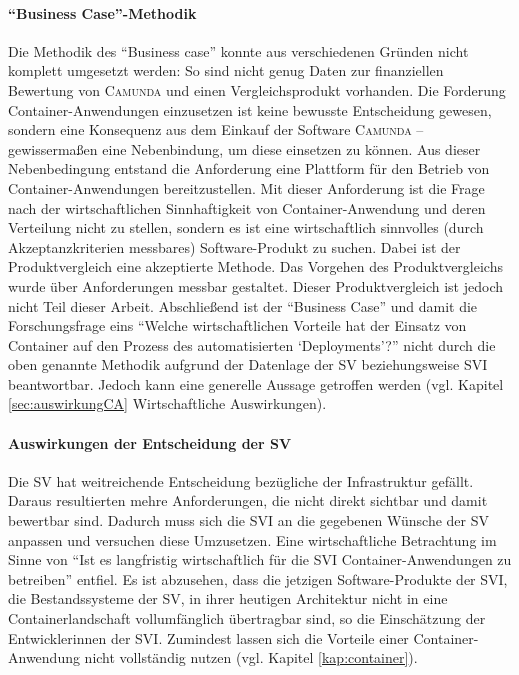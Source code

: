 \paragraph{\enquote{Business Case}-Methodik} Die Methodik des \enquote{Business case} konnte aus verschiedenen Gründen nicht komplett umgesetzt werden: So sind nicht genug Daten zur finanziellen Bewertung von \textsc{Camunda} und einen Vergleichsprodukt vorhanden. Die Forderung Container-Anwendungen einzusetzen ist keine bewusste Entscheidung gewesen, sondern eine Konsequenz aus dem Einkauf der Software \textsc{Camunda} -- gewissermaßen eine Nebenbindung, um diese einsetzen zu können. Aus dieser Nebenbedingung entstand die Anforderung eine Plattform für den Betrieb von Container-Anwendungen bereitzustellen. Mit dieser Anforderung ist die Frage nach der wirtschaftlichen Sinnhaftigkeit von Container-Anwendung und deren Verteilung nicht zu stellen, sondern es ist eine wirtschaftlich sinnvolles (durch Akzeptanzkriterien messbares) Software-Produkt zu suchen. Dabei ist der Produktvergleich eine akzeptierte Methode. Das Vorgehen des Produktvergleichs wurde über Anforderungen messbar gestaltet. Dieser Produktvergleich ist jedoch nicht Teil dieser Arbeit. Abschließend ist der \enquote{Business Case} und damit die Forschungsfrage eins \enquote{Welche wirtschaftlichen Vorteile hat der Einsatz von Container auf den Prozess des automatisierten \enquote{Deployments}?} nicht durch die oben genannte Methodik aufgrund der Datenlage der \ac{SV} beziehungsweise \ac{SVI} beantwortbar. Jedoch kann eine generelle Aussage getroffen werden (vgl. Kapitel \vref{sec:auswirkungCA} Wirtschaftliche Auswirkungen).

\paragraph{Auswirkungen der Entscheidung der \ac{SV}} Die \ac{SV} hat weitreichende Entscheidung bezügliche der Infrastruktur gefällt. Daraus resultierten mehre Anforderungen, die nicht direkt sichtbar und damit bewertbar sind. Dadurch muss sich die \ac{SVI} an die gegebenen Wünsche der \ac{SV} anpassen und versuchen diese Umzusetzen. Eine wirtschaftliche Betrachtung im Sinne von \enquote{Ist es langfristig wirtschaftlich für die \ac{SVI} Container-Anwendungen zu betreiben} entfiel. Es ist abzusehen, dass die jetzigen Software-Produkte der \ac{SVI}, die Bestandssysteme der \ac{SV}, in ihrer heutigen Architektur nicht in eine Containerlandschaft vollumfänglich übertragbar sind, so die Einschätzung der Entwicklerinnen der \ac{SVI}. Zumindest lassen sich die Vorteile einer Container-Anwendung nicht vollständig nutzen (vgl. Kapitel \vref{kap:container}).

